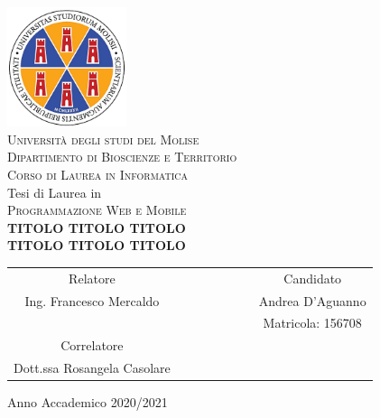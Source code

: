 
\begin{titlepage}
 \begin{center}
     \includegraphics[width=3.5cm]{imgs/unimol/unimol_color.png}\\
     \vspace{1em}
     {\Large \textsc{Università  degli studi del Molise}}\\
     \vspace{1em}
     {\Large \textsc{Dipartimento di Bioscienze e Territorio}}\\
     \vspace{1em}
      {\Large \textsc{Corso di Laurea in Informatica}}\\
     \vspace{2em}
     {\normalsize Tesi di Laurea in}\\
     \vspace{1em}
     {\Large \textsc{Programmazione Web e Mobile}}\\
     \vspace{3em}
     {\LARGE\textbf{
     TITOLO TITOLO TITOLO\\\vspace{0.4em}
     	TITOLO TITOLO TITOLO
     }}\\
 \end{center}

\vskip 1.2cm
  \begin{center}
    \begin{tabular}{c c c c c c c c}
      Relatore & & & & & & & Candidato \\[0.2cm]
      \large{Ing. Francesco Mercaldo} & & & & & & & \large{Andrea D'Aguanno} \\ & & & & & & & {Matricola: 156708}\\[0.4cm] 
       Correlatore & & & & & & & \\[0.2cm]
      \large{Dott.ssa Rosangela Casolare}& & & & & & & \\
    \end{tabular}
  \end{center}

\vskip 1.5cm
\begin{center}
{\normalsize Anno Accademico 2020/2021}
\end{center}
\end{titlepage}

\clearpage{\pagestyle{empty}\cleardoublepage}
